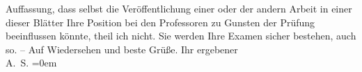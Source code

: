 \begin{ledgroupsized}[t]{13cm}
                    Auffassung, dass \introOben{}selbst\introOben{} die Veröffentlichung einer oder
                    der andern Arbeit in einer dieser Blätter Ihre Position bei den Professoren zu
                    Gunsten der Prüfung beeinflussen könnte, theil ich nicht. Sie werden Ihre {\pb}Examen sicher bestehen, auch so.\pend
           \pstart
           – Auf Wiedersehen und beste Grüße. Ihr ergebener{\\[\baselineskip]}\spacefill\mbox{A. S.}\pend
           \leftskip=0em{}\endnumbering{}\end{ledgroupsized}  \newcommand{\dateiname}{L01854}\newcommand{\titel}{Arthur Schnitzler an Albert Ehrenstein, 7. 7. 1909}\newcommand{\editorInnen}{Martin Anton Müller und Gerd-Hermann Susen}
      